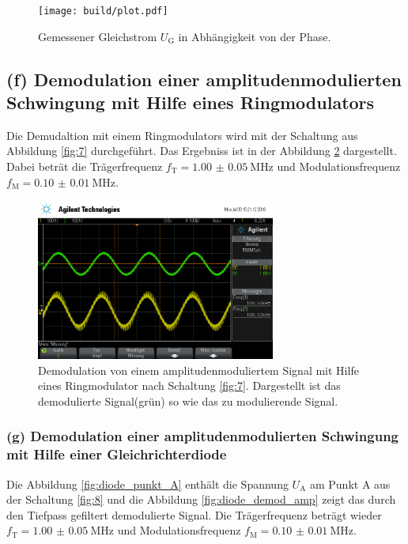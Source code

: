 \begin{figure}
  \centering
  \texttt{[image: build/plot.pdf]}
  \caption{Gemessener Gleichstrom $U_{\text{G}}$ in Abhängigkeit von der Phase.}
  \label{fig:plot}
\end{figure}

\subsection{(f) Demodulation einer amplitudenmodulierten Schwingung
mit Hilfe eines Ringmodulators}
\label{subsubsec:auswertung_f}
Die Demudaltion mit einem Ringmodulators wird mit der Schaltung
aus Abbildung \ref{fig:7} durchgeführt. Das Ergebniss ist
in der Abbildung \ref{fig:amp_demod_ring} dargestellt.
Dabei beträt die Trägerfrequenz $f_{\text{T}}=\SI{1.00(5)}{\mega\hertz}$
und Modulationsfrequenz $f_{\text{M}}=\SI{0.10(1)}{\mega\hertz}$.


\begin{figure}
  \centering
  \includegraphics[width=0.7\textwidth]{osci/amp_demod.png}
  \caption{Demodulation von einem amplitudenmoduliertem Signal mit Hilfe eines
  Ringmodulator nach Schaltung \ref{fig:7}. Dargestellt ist das demodulierte Signal(grün) so wie das zu modulierende Signal.}
  \label{fig:amp_demod_ring}
\end{figure}





\subsubsection{(g) Demodulation einer amplitudenmodulierten Schwingung
mit Hilfe einer Gleichrichterdiode}
\label{subsubsec:auswertung_g}
Die Abbildung \ref{fig:diode_punkt_A} enthält
die Spannung $U_{\text{A}}$ am Punkt A aus der
Schaltung \ref{fig:8} und die Abbildung \ref{fig:diode_demod_amp}
zeigt das durch den Tiefpass gefiltert demodulierte Signal.
Die Trägerfrequenz beträgt wieder $f_{\text{T}}=\SI{1.00(5)}{\mega\hertz}$
und Modulationsfrequenz $f_{\text{M}}=\SI{0.10(1)}{\mega\hertz}$.


